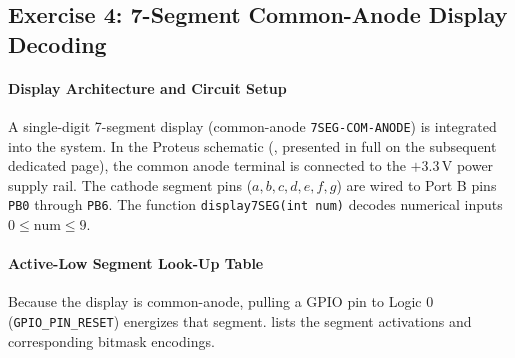 \documentclass[oneside,final]{hcmut-report}
\begin{document}
\subsection{Exercise 4: 7-Segment Common-Anode Display Decoding}
\label{subsec:ex4}
\paragraph{Display Architecture and Circuit Setup}
A single-digit 7-segment display (common-anode \texttt{7SEG-COM-ANODE}) is integrated into the system. In the Proteus schematic (, presented in full on the subsequent dedicated page), the common anode terminal is connected to the \textbf{$+3.3\,\text{V}$} power supply rail. The cathode segment pins ($a, b, c, d, e, f, g$) are wired to Port B pins \texttt{PB0} through \texttt{PB6}. The function \texttt{display7SEG(int num)} decodes numerical inputs $0 \le \text{num} \le 9$.

\paragraph{Active-Low Segment Look-Up Table}
Because the display is common-anode, pulling a GPIO pin to Logic 0 (\texttt{GPIO\_PIN\_RESET}) energizes that segment.  lists the segment activations and corresponding bitmask encodings.
\end{document}
